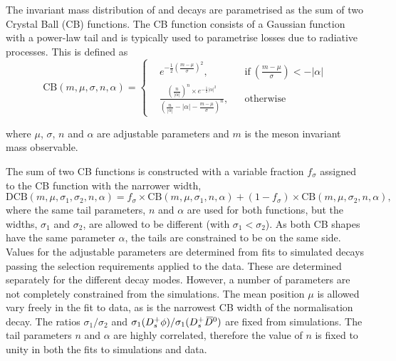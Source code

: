 The invariant mass distribution of \decay{\Bp}{\Dsp\Dzb} and \decay{\Bp}{\Dsp\Kp\Km} decays are parametrised as the sum of two Crystal Ball (CB) functions.
The CB function consists of a Gaussian function with a power-law tail and is typically used to parametrise losses due to radiative processes.
This is defined as
\begin{equation}
\text{CB}(m,\mu,\sigma,n,\alpha) = \left \{
  \begin{aligned}
    &e^{-\frac{1}{2} \left(\frac{m-\mu}{\sigma}\right)^2}, && \text{if}\ \left(\frac{m-\mu}{\sigma}\right) < -|\alpha|\\
    &\frac{\left(\frac{n}{|\alpha|}\right)^n\times e ^{-\frac{1}{2}|\alpha|^2} }{\left(\frac{n}{|\alpha|}-|\alpha| - \frac{m-\mu}{\sigma}\right)^n}, && \text{otherwise}
  \end{aligned} \right.
\end{equation} 

where $\mu$, $\sigma$, $n$ and $\alpha$ are adjustable parameters and $m$ is the \B meson invariant mass observable.

The sum of two CB functions is constructed with a variable fraction $f_\sigma$ assigned to the CB function with the narrower width,
\begin{equation}
\text{DCB}(m,\mu,\sigma_1,\sigma_2,n,\alpha) = f_\sigma \times \text{CB}(m,\mu,\sigma_1,n,\alpha) + (1-f_\sigma) \times \text{CB}(m,\mu,\sigma_2,n,\alpha),
\label{eq:DoubleBD}
\end{equation}
where the same tail parameters, $n$ and $\alpha$ are used for both functions, but the widths, $\sigma_1$ and $\sigma_2$, are allowed to be different (with $\sigma_1 < \sigma_2$).
As both CB shapes have the same parameter $\alpha$, the tails are constrained to be on the same side.
Values for the adjustable parameters are determined from fits to simulated decays passing the selection requirements applied to the data. These are determined separately for the different \Dsp decay modes. However, a number of parameters are not completely constrained from the simulations. The mean position $\mu$ is allowed vary freely in the fit to data, as is the narrowest CB width of the normalisation decay. The ratios $\sigma_1/\sigma_2$ and $\sigma_{1}({{D}^+_{s}}\phi) / \sigma_{1}({{D}^+_{s}}{{\kern 0.2em\overline{\kern -0.2em D}{}}{}^0})$ are fixed from simulations.
The tail parameters $n$ and $\alpha$ are highly correlated, therefore the value of $n$ is fixed to unity in both the fits to simulations and data. 



